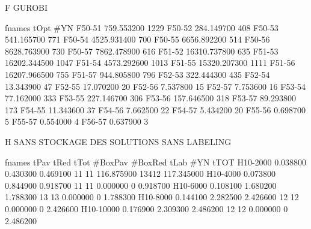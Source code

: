 F GUROBI


      fnames         tOpt        #YN
      F50-51   759.553200       1229
      F50-52   284.149700        408
      F50-53   541.165700        771
      F50-54   4525.931400        700
      F50-55   6656.892200        514
      F50-56   8628.763900        730
      F50-57   7862.478900        616
      F51-52   16310.737800        635
      F51-53   16202.344500       1047
      F51-54   4573.292600       1013
      F51-55   15320.207300       1111
      F51-56   16207.966500        755
      F51-57   944.805800        796
      F52-53   322.444300        435
      F52-54    13.343900         47
      F52-55    17.070200         20
      F52-56     7.537800         15
      F52-57     7.753600         16
      F53-54    77.162000        333
      F53-55   227.146700        306
      F53-56   157.646500        318
      F53-57    89.293800        173
      F54-55    11.343600         37
      F54-56     7.662500         22
      F54-57     5.434200         20
      F55-56     0.698700          5
      F55-57     0.554000          4
      F56-57     0.637900          3


H SANS STOCKAGE DES SOLUTIONS SANS LABELING

      fnames         tPav         tRed         tTot    #BoxPav    #BoxRed         tLab        #YN         tTOT
    H10-2000     0.038800     0.430300     0.469100         11         11   116.875900      13412   117.345000
    H10-4000     0.073800     0.844900     0.918700         11         11     0.000000          0     0.918700
    H10-6000     0.108100     1.680200     1.788300         13         13     0.000000          0     1.788300
    H10-8000     0.144100     2.282500     2.426600         12         12     0.000000          0     2.426600
   H10-10000     0.176900     2.309300     2.486200         12         12     0.000000          0     2.486200

